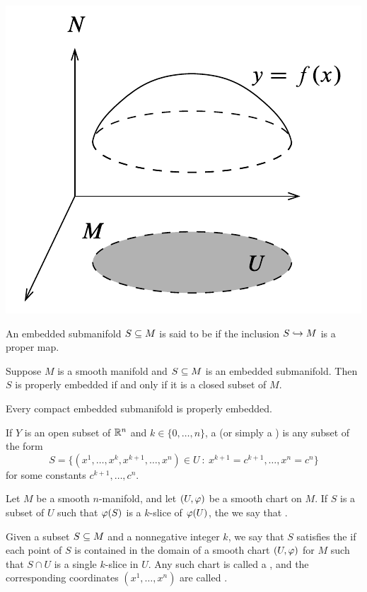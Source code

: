 \begin{center}
    \includegraphics[scale = 0.5]{chapter05/c5f1.png}
\end{center}

\dfn An embedded submanifold $S\subseteq M$ is said to be  if the inclusion $S\hookrightarrow M$ is a proper map.

\begin{prop}
Suppose $M$ is a smooth manifold \wowob and $S\subseteq M$ is an embedded submanifold. Then $S$ is properly embedded if and only if it is a closed subset of $M$.
\end{prop}

\begin{cor}
Every compact embedded submanifold is properly embedded.
\end{cor}

\dfn If $Y$ is an open subset of $\mathbb{R}^n$ and $k\in \{0,\ldots,n\}$, a  (or simply a ) is any subset of the form 
\[S = \{(x^1,\ldots,x^k,x^{k + 1},\ldots, x^n)\in U\ :\ x^{k + 1} = c^{k + 1},\ldots,x^n = c^n\}\]
for some constants $c^{k + 1},\ldots,c^n$.

\dfn Let $M$ be a smooth $n$-manifold, and let $(U,\varphi)$ be a smooth chart on $M$. If $S$ is a subset of $U$ such that $\varphi(S)$ is a $k$-slice of $\varphi(U)$, the we say that .

\dfn Given a subset $S\subseteq M$ and a nonnegative integer $k$, we say that $S$ satisfies the  if each point of $S$ is contained in the domain of a smooth chart $(U, \varphi)$ for $M$ such that $S\cap U$ is a single $k$-slice in $U$. Any such chart is called a , and the corresponding coordinates $(x^1,\ldots,x^n)$ are called .

